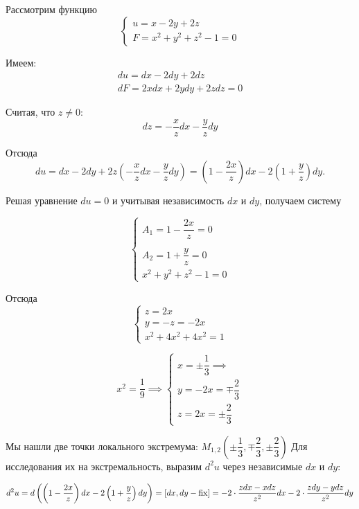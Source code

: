 \documentclass[../../main.tex]{subfiles}
\begin{document}
	\begin{example}
	\;
	
	Рассмотрим функцию 
	\[ \begin{cases}
	u = x - 2y + 2z \\
	F = x^2 + y^2 + z^2 -1 = 0
	\end{cases} \]
	
	Имеем:
	\[\begin{array}{l}
	du = dx - 2dy + 2dz \\
	dF = 2xdx + 2ydy + 2zdz = 0
	\end{array}\]
	
	Считая, что $z \ne 0$:
	\[dz = -\dfrac{x}{z}dx - \dfrac{y}{z}dy\]
	
	Отсюда
	\[du = dx - 2dy + 2z\left( -\dfrac{x}{z}dx - 
	\dfrac{y}{z} dy \right) = 
	\left( 1 - \dfrac{2x}{z} \right)dx - 
	2\left( 1 + \dfrac{y}{z} \right)dy.\]
	
	Решая уравнение $du = 0$ и учитывая независимость $dx$ и $dy$,
	получаем систему
	
	\[
	\begin{cases}
	A_1 = 1 - \dfrac{2x}{z} = 0 \\
    \\
	A_2 = 1 + \dfrac{y}{z} = 0 \\
	x^2 + y^2 + z^2 - 1 = 0
	\end{cases} 
	\]
	
	Отсюда
	\[ \begin{cases}
	z = 2x \\
	y = -z = -2x \\
	x^2 + 4x^2 + 4x^2 = 1
	\end{cases} \]
	
	\[x^2 = \dfrac{1}{9} \implies
	 \begin{cases}
        x = \pm \dfrac{1}{3} \implies \\
        y = -2x = \mp \dfrac{2}{3} \\
        z = 2x = \pm \dfrac{2}{3}
	 \end{cases}
	\]
 
	Мы нашли две точки локального экстремума: $M_{1,2} 
	\left( \pm \dfrac{1}{3}, \mp \dfrac{2}{3}, 
	\pm \dfrac{2}{3} \right)$ Для исследования их на 
	экстремальность, выразим $d^2 u$ через
	независимые $dx$ и $dy$:
	
	\[d^2u = d\left( \left(1 - \dfrac{2x}{z}\right)dx - 
	2\left(1 + \dfrac{y}{z}\right)dy\right) = 
	\left[dx, dy - \operatorname{fix}\right] = -2 \cdot 
	\dfrac{zdx - xdz}{z^2}dx - 2 \cdot \dfrac{zdy - ydz}{z^2}dy\]
	

\end{example}
\end{document}

